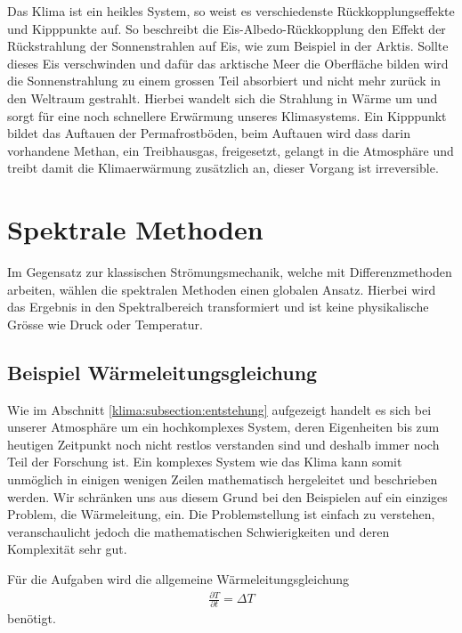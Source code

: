 \begin{refsection}
Das Klima ist ein heikles System, so weist es verschiedenste Rückkopplungseffekte und Kipppunkte auf. So beschreibt die Eis-Albedo-Rückkopplung den Effekt der Rückstrahlung der Sonnenstrahlen auf Eis, wie zum Beispiel in der Arktis. Sollte dieses Eis verschwinden und dafür das arktische Meer die Oberfläche bilden wird die Sonnenstrahlung zu einem grossen Teil absorbiert und nicht mehr zurück in den Weltraum gestrahlt. Hierbei wandelt sich die Strahlung in Wärme um und sorgt für eine noch schnellere Erwärmung unseres Klimasystems. Ein Kipppunkt bildet das Auftauen der Permafrostböden, beim Auftauen wird dass darin vorhandene Methan, ein Treibhausgas, freigesetzt, gelangt in die Atmosphäre und treibt damit die Klimaerwärmung zusätzlich an, dieser Vorgang ist irreversible.

\section{Spektrale Methoden
\label{klima:section:spektrale}}
Im Gegensatz zur klassischen Strömungsmechanik, welche mit Differenzmethoden arbeiten, wählen die spektralen Methoden einen globalen Ansatz. Hierbei wird das Ergebnis in den Spektralbereich transformiert und ist keine physikalische Grösse wie Druck oder Temperatur.

\subsection{Beispiel Wärmeleitungsgleichung}
Wie im Abschnitt \ref{klima:subsection:entstehung}  aufgezeigt handelt es sich bei unserer Atmosphäre um ein hochkomplexes System, deren Eigenheiten bis zum heutigen Zeitpunkt noch nicht restlos verstanden sind und deshalb immer noch Teil der Forschung ist. Ein komplexes System wie das Klima kann somit unmöglich in einigen wenigen Zeilen mathematisch hergeleitet und beschrieben werden. Wir schränken uns aus diesem Grund bei den Beispielen auf ein einziges Problem, die Wärmeleitung, ein. Die Problemstellung ist einfach zu verstehen, veranschaulicht jedoch die mathematischen Schwierigkeiten und deren Komplexität sehr gut.

Für die Aufgaben wird die allgemeine Wärmeleitungsgleichung
\begin{align}
\frac{\partial T}{\partial t} = \Delta T
\label{klima:bsp:pdgl}
\end{align}
benötigt.


\end{refsection}

